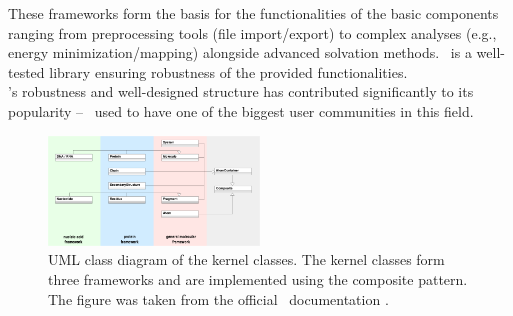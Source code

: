 These frameworks form the basis for the functionalities of the basic components ranging from preprocessing tools (file import/export) to complex analyses (e.g., energy minimization/mapping) alongside advanced solvation methods. 
\ball\ is a well-tested library ensuring robustness of the provided functionalities. \\

\ball's robustness and well-designed structure has contributed significantly to its popularity -- \ball\ used to have one of the biggest user communities in this field.


\begin{figure}[t]
	\centerline{\includegraphics[width=0.5\textwidth]{gfx/KERNEL.png}}
	\caption{UML class diagram of the kernel classes. The kernel classes form three frameworks and are implemented using the composite pattern. The figure was taken from the official \ball\ documentation \cite{BALLTutorial}.}
	\label{fig:ball_structure}
\end{figure}

